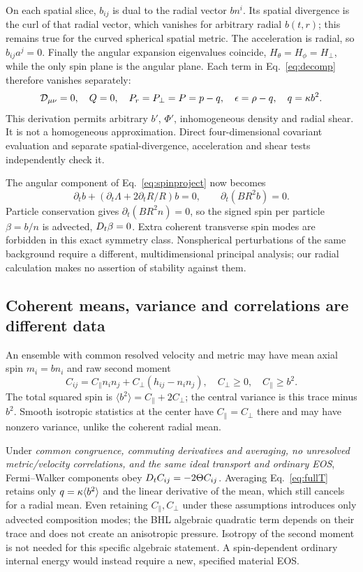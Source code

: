 On each spatial slice, $b_{ij}$ is dual to the radial vector $b n^i$. Its spatial divergence is the curl of that radial vector, which vanishes for arbitrary radial $b(t,r)$; this remains true for the curved spherical spatial metric. The acceleration is radial, so $b_{ij}a^j=0$. Finally the angular expansion eigenvalues coincide, $H_\theta=H_\phi=H_\perp$, while the only spin plane is the angular plane. Each term in Eq.~\eqref{eq:decomp} therefore vanishes separately:
\begin{equation}
 \mathcal D_{\mu\nu}=0,\quad Q=0,\quad P_r=P_\perp=P=p-q,\quad \epsilon=\rho-q,\quad q=\kappa b^2.\label{eq:radsource}
\end{equation}
This derivation permits arbitrary $b'$, $\Phi'$, inhomogeneous density and radial shear. It is not a homogeneous approximation. Direct four-dimensional covariant evaluation and separate spatial-divergence, acceleration and shear tests independently check it.

The angular component of Eq.~\eqref{eq:spinproject} now becomes
\begin{equation}
 \partial_t b+(\partial_t\Lambda+2\partial_tR/R)b=0,
 \qquad \partial_t(BR^2b)=0.\label{eq:radtransport}
\end{equation}
Particle conservation gives $\partial_t(BR^2n)=0$, so the signed spin per particle $\beta=b/n$ is advected, $D_t\beta=0$. Extra coherent transverse spin modes are forbidden in this exact symmetry class. Nonspherical perturbations of the same background require a different, multidimensional principal analysis; our radial calculation makes no assertion of stability against them.

\subsection{Coherent means, variance and correlations are different data}
An ensemble with common resolved velocity and metric may have mean axial spin $m_i=b n_i$ and raw second moment
\begin{equation}
 C_{ij}=C_\parallel n_i n_j+C_\perp(h_{ij}-n_i n_j),\quad
 C_\perp\geq0,\quad C_\parallel\geq b^2.
\end{equation}
The total squared spin is $\langle b^2\rangle=C_\parallel+2C_\perp$; the central variance is this trace minus $b^2$. Smooth isotropic statistics at the center have $C_\parallel=C_\perp$ there and may have nonzero variance, unlike the coherent radial mean.

Under \emph{common congruence, commuting derivatives and averaging, no unresolved metric/velocity correlations, and the same ideal transport and ordinary EOS}, Fermi--Walker components obey $D_t C_{ij}=-2\Theta C_{ij}$. Averaging Eq.~\eqref{eq:fullT} retains only $q=\kappa\langle b^2\rangle$ and the linear derivative of the mean, which still cancels for a radial mean. Even retaining $C_\parallel,C_\perp$ under these assumptions introduces only advected composition modes; the BHL algebraic quadratic term depends on their trace and does not create an anisotropic pressure. Isotropy of the second moment is not needed for this specific algebraic statement. A spin-dependent ordinary internal energy would instead require a new, specified material EOS.

